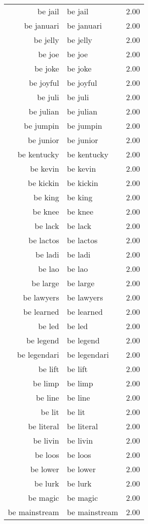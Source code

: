 \begin{table}[ht]
\begin{tabular}{rlr}
  be jail & be jail & 2.00 \\ 
  be januari & be januari & 2.00 \\ 
  be jelly & be jelly & 2.00 \\ 
  be joe & be joe & 2.00 \\ 
  be joke & be joke & 2.00 \\ 
  be joyful & be joyful & 2.00 \\ 
  be juli & be juli & 2.00 \\ 
  be julian & be julian & 2.00 \\ 
  be jumpin & be jumpin & 2.00 \\ 
  be junior & be junior & 2.00 \\ 
  be kentucky & be kentucky & 2.00 \\ 
  be kevin & be kevin & 2.00 \\ 
  be kickin & be kickin & 2.00 \\ 
  be king & be king & 2.00 \\ 
  be knee & be knee & 2.00 \\ 
  be lack & be lack & 2.00 \\ 
  be lactos & be lactos & 2.00 \\ 
  be ladi & be ladi & 2.00 \\ 
  be lao & be lao & 2.00 \\ 
  be large & be large & 2.00 \\ 
  be lawyers & be lawyers & 2.00 \\ 
  be learned & be learned & 2.00 \\ 
  be led & be led & 2.00 \\ 
  be legend & be legend & 2.00 \\ 
  be legendari & be legendari & 2.00 \\ 
  be lift & be lift & 2.00 \\ 
  be limp & be limp & 2.00 \\ 
  be line & be line & 2.00 \\ 
  be lit & be lit & 2.00 \\ 
  be literal & be literal & 2.00 \\ 
  be livin & be livin & 2.00 \\ 
  be loos & be loos & 2.00 \\ 
  be lower & be lower & 2.00 \\ 
  be lurk & be lurk & 2.00 \\ 
  be magic & be magic & 2.00 \\ 
  be mainstream & be mainstream & 2.00 \\ 

\end{tabular}
\end{table}
